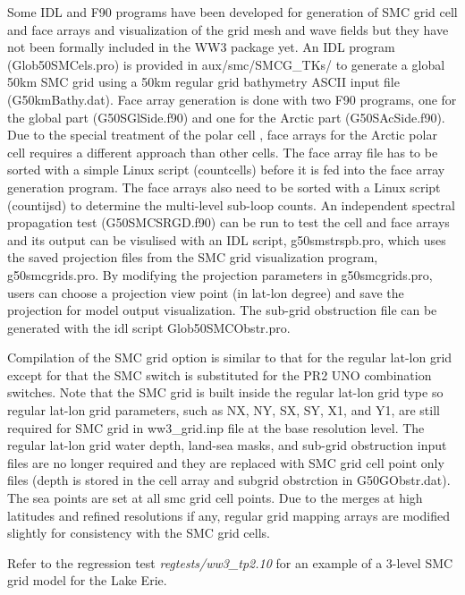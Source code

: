 Some IDL and F90 programs have been developed for generation of SMC grid cell
and face arrays and visualization of the grid mesh and wave fields but they
have not been formally included in the WW3 package yet. An IDL program 
(Glob50SMCels.pro) is provided in aux/smc/SMCG\_TKs/ to generate a global 50km 
SMC grid using a 50km regular grid bathymetry ASCII input file (G50kmBathy.dat). 
Face array generation is done with two F90 programs, one for the global part 
(G50SGlSide.f90) and one for the Arctic part (G50SAcSide.f90).  Due to the special 
treatment of the polar cell \citep{art:Li12}, face arrays for the Arctic polar cell 
requires a different approach than other cells. The face array file has to be 
sorted with a simple Linux script (countcells) before it is fed into the face array 
generation program.  The face arrays also need to be sorted with a Linux script 
(countijsd) to determine the multi-level sub-loop counts.  An independent spectral 
propagation test (G50SMCSRGD.f90) can be run to test the cell and face arrays and 
its output can be visulised with an IDL script, g50smstrspb.pro, which uses the 
saved projection files from the SMC grid visualization program, g50smcgrids.pro. 
By modifying the projection parameters in g50smcgrids.pro, users can choose a 
projection view point (in lat-lon degree) and save the projection for model 
output visualization.  The sub-grid obstruction file can be generated with the 
idl script Glob50SMCObstr.pro.

Compilation of the SMC grid option is similar to that for the regular
lat-lon grid except for that the SMC switch is substituted for the
PR2 UNO combination switches. Note that the SMC grid is built inside
the regular lat-lon grid type so regular lat-lon grid parameters,
such as NX, NY, SX, SY, X1, and Y1, are still required for SMC grid
in ww3\_grid.inp file at the base resolution level. The regular lat-lon
grid water depth, land-sea masks, and sub-grid obstruction input files
are no longer required and they are replaced with SMC grid cell point only 
files (depth is stored in the cell array and subgrid obstrction in 
G50GObstr.dat).  The sea points are set at all smc grid cell points. 
Due to the merges at high latitudes and refined resolutions if any,
regular grid mapping arrays are modified slightly for consistency
with the SMC grid cells. 

Refer to the regression test \emph{regtests/ww3\_tp2.10}
for an example of a 3-level SMC grid model for the Lake Erie.

